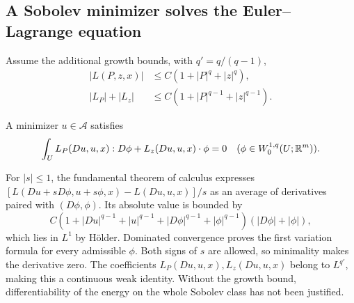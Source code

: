 \subsection{A Sobolev minimizer solves the Euler--Lagrange equation}
Assume the additional growth bounds, with $q'=q/(q-1)$,
\begin{equation}\label{eq:8-growth}
 \begin{split}
 |L(P,z,x)|&\leq C(1+|P|^q+|z|^q),\\
 |L_P|+|L_z|&\leq C(1+|P|^{q-1}+|z|^{q-1}).
 \end{split}
\end{equation}
\Needspace{55mm}
\begin{theorem}
A minimizer $u\in\mathcal A$ satisfies
\[
 \int_U L_P(Du,u,x):D\phi+L_z(Du,u,x)\cdot\phi=0
 \quad(\phi\in W^{1,q}_0(U;\mathbb{R}^m)).
\]
\end{theorem}
\begin{expandedproof}
For $|s|\leq1$, the fundamental theorem of calculus expresses
$[L(Du+sD\phi,u+s\phi,x)-L(Du,u,x)]/s$ as an average of derivatives
paired with $(D\phi,\phi)$. Its absolute value is bounded by
\[
 C(1+|Du|^{q-1}+|u|^{q-1}+|D\phi|^{q-1}+|\phi|^{q-1})
                 (|D\phi|+|\phi|),
\]
which lies in $L^1$ by H\"older. Dominated convergence proves the first
variation formula for every admissible $\phi$. Both signs of $s$ are
allowed, so minimality makes the derivative zero. The coefficients
$L_P(Du,u,x),L_z(Du,u,x)$ belong to $L^{q'}$, making this a continuous
weak identity. Without the growth bound, differentiability of the energy
on the whole Sobolev class has not been justified.
\end{expandedproof}
\Needspace{55mm}

\Needspace{45mm}
